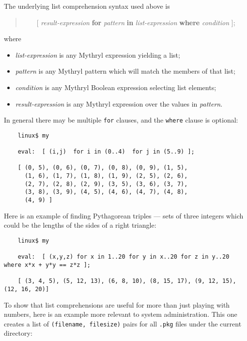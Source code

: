 The underlying list comprehension syntax used above is

\begin{quotation}
~~~~[ {\it result-expression} {\bf for} {\it pattern} {\bf in} {\it list-expression} {\bf where} {\it condition} ];
\end{quotation}

where
\begin{itemize}
\item {\it list-expression} is any Mythryl expression yielding a list;
\item {\it pattern} is any Mythryl pattern which will match the members of that list;
\item {\it condition} is any Mythryl Boolean expression selecting list elements;
\item {\it result-expression} is any Mythryl expression over the values in {\it pattern}.
\end{itemize}

In general there may be multiple {\tt for} clauses, and the {\tt where} clause 
is optional:

\begin{verbatim}
    linux$ my

    eval:  [ (i,j)  for i in (0..4)  for j in (5..9) ];

    [ (0, 5), (0, 6), (0, 7), (0, 8), (0, 9), (1, 5), 
      (1, 6), (1, 7), (1, 8), (1, 9), (2, 5), (2, 6), 
      (2, 7), (2, 8), (2, 9), (3, 5), (3, 6), (3, 7), 
      (3, 8), (3, 9), (4, 5), (4, 6), (4, 7), (4, 8), 
      (4, 9) ]

\end{verbatim}

Here is an example of finding Pythagorean triples --- sets 
of three integers which could be the lengths of the sides of a 
right triangle:

\begin{verbatim}
    linux$ my

    eval:  [ (x,y,z) for x in 1..20 for y in x..20 for z in y..20 where x*x + y*y == z*z ];

    [ (3, 4, 5), (5, 12, 13), (6, 8, 10), (8, 15, 17), (9, 12, 15), (12, 16, 20)]
\end{verbatim}

To show that list comprehensions are useful for 
more than just playing with numbers, here is an example 
more relevant to system administration. 
This one creates a list of {\tt (filename, filesize)} pairs 
for all {\tt .pkg} files under the current directory:


